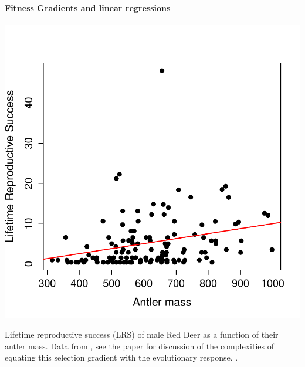 \paragraph{Fitness Gradients and linear regressions}
\begin{marginfigure}
\begin{center}
\includegraphics[width= \textwidth]{Journal_figs/Quant_gen/red_deer_selection_gradient/selection_grad_deer.pdf}
\end{center}
\caption{Lifetime reproductive success (LRS) of male Red Deer as a
  function of their antler mass. Data from \citet{kruuk2002antler},
  see the paper for discussion of the complexities of equating this
  selection gradient with the evolutionary response. . } \label{fig:red_deer_fitness_grad}  
\end{marginfigure}

